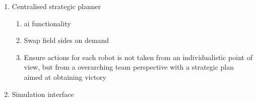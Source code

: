 \begin{enumerate}[label*=\arabic*.]
\begin{enumerate}[label*=\arabic*.]
\begin{enumerate}[label*=\arabic*.]
\begin{enumerate}[label*=\arabic*.]
                \item Blue team
            \end{enumerate}
            \item Direct free kick
            \begin{enumerate}[label*=\arabic*.]
                \item Yellow team
                \item Blue team
            \end{enumerate}
            \item Timeout
            \begin{enumerate}[label*=\arabic*.]
                \item Yellow team
                \item Blue team
            \end{enumerate}
            \item Ball placement
            \begin{enumerate}[label*=\arabic*.]
                \item Yellow team
                \item Blue team
            \end{enumerate}
        \end{enumerate}
        \item Send robot status information
        \item Hot-swap battery. The battery should be swappable by plugging in the robot to an alternative source and then changing the battery.
        \item Continuously monitor the capacity of the battery.
        \item Continuously monitor the temperature of the \ac{mcu}.
    \end{enumerate}
    \item Centralised strategic planner
    \begin{enumerate}[label*=\arabic*.]
        \item \ac{ai} functionality
        \item Swap field sides on demand
        \item Ensure actions for each robot is not taken from an individualistic point of view, but from a overarching team perspective with a strategic plan aimed at obtaining victory
    \end{enumerate}
    \item Simulation interface
    \begin{enumerate}[label*=\arabic*.]

\end{enumerate}
\end{enumerate}
